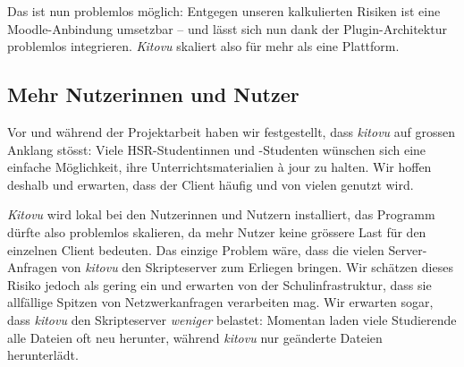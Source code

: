 \documentclass[a4paper]{article}
\begin{document}
Das ist nun problemlos möglich: Entgegen unseren kalkulierten Risiken ist eine Moodle-Anbindung umsetzbar -- und lässt sich nun dank der Plugin-Architektur problemlos integrieren. \emph{Kitovu} skaliert also für mehr als eine Plattform.


\subsection{Mehr Nutzerinnen und Nutzer}

Vor und während der Projektarbeit haben wir festgestellt, dass \emph{kitovu} auf grossen Anklang stösst: Viele HSR-Studentinnen und -Studenten wünschen sich eine einfache Möglichkeit, ihre Unterrichtsmaterialien à jour zu halten. Wir hoffen deshalb und erwarten, dass der Client häufig und von vielen genutzt wird.

\emph{Kitovu} wird lokal bei den Nutzerinnen und Nutzern installiert, das Programm dürfte also problemlos skalieren, da mehr Nutzer keine grössere Last für den einzelnen Client bedeuten. Das einzige Problem wäre, dass die vielen Server-Anfragen von \emph{kitovu} den Skripteserver zum Erliegen bringen. Wir schätzen dieses Risiko jedoch als gering ein und erwarten von der Schulinfrastruktur, dass sie allfällige Spitzen von Netzwerkanfragen verarbeiten mag. Wir erwarten sogar, dass  \emph{kitovu} den Skripteserver \emph{weniger} belastet: Momentan laden viele Studierende alle Dateien oft neu herunter, während \emph{kitovu} nur geänderte Dateien herunterlädt.
\end{document}
